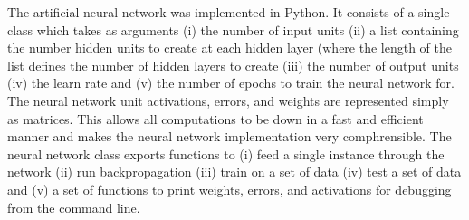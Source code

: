The artificial neural network was implemented in Python.
It consists of a single class which takes as arguments (i) the number of input units (ii) a list containing the number hidden units to create at each hidden layer (where the length of the list defines the number of hidden layers to create (iii) the number of output units (iv) the learn rate and (v) the number of epochs to train the neural network for.
The neural network unit activations, errors, and weights are represented simply as matrices.
This allows all computations to be down in a fast and efficient manner and makes the neural network implementation very comphrensible.
The neural network class exports functions to (i) feed a single instance through the network (ii) run backpropagation (iii) train on a set of data (iv) test a set of data and (v) a set of functions to print weights, errors, and activations for debugging from the command line.
 

